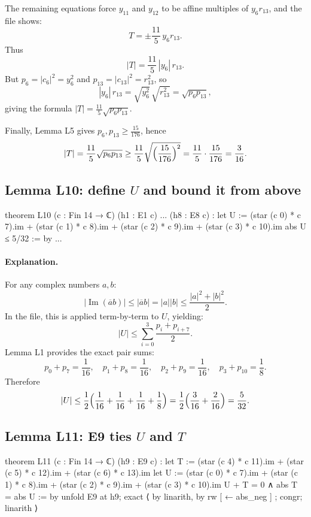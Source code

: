 \documentclass[11pt]{article}
\begin{document}
The remaining equations force $y_{11}$ and $y_{12}$ to be affine multiples of $y_6 r_{13}$, and the file shows:
\[
T = \pm \frac{11}{5}\, y_6 r_{13}.
\]
Thus
\[
|T| = \frac{11}{5}\,|y_6|\,r_{13}.
\]
But $p_6=|c_6|^2=y_6^2$ and $p_{13}=|c_{13}|^2=r_{13}^2$, so
\[
|y_6|\,r_{13} = \sqrt{y_6^2}\,\sqrt{r_{13}^2} = \sqrt{p_6p_{13}},
\]
giving the formula $|T|=\frac{11}{5}\sqrt{p_6p_{13}}$.

Finally, Lemma L5 gives $p_6,p_{13}\ge \frac{15}{176}$, hence
\[
|T|=\frac{11}{5}\sqrt{p_6p_{13}}
\ge \frac{11}{5}\sqrt{\Bigl(\frac{15}{176}\Bigr)^2}
= \frac{11}{5}\cdot\frac{15}{176}
= \frac{3}{16}.
\]

\subsection*{Lemma L10: define $U$ and bound it from above}

\begin{LeanCode}
theorem L10 (c : Fin 14 → ℂ)
  (h1 : E1 c) ... (h8 : E8 c) :
  let U := (star (c 0) * c 7).im + (star (c 1) * c 8).im
         + (star (c 2) * c 9).im + (star (c 3) * c 10).im
  abs U ≤ 5/32 := by
  ...
\end{LeanCode}

\paragraph{Explanation.}
For any complex numbers $a,b$:
\[
|\operatorname{Im}(\overline{a}b)| \le |\overline{a}b| = |a||b|
\le \frac{|a|^2+|b|^2}{2}.
\]
In the file, this is applied term-by-term to $U$, yielding:
\[
|U|
\le \sum_{i=0}^{3} \frac{p_i+p_{i+7}}{2}.
\]
Lemma L1 provides the exact pair sums:
\[
p_0+p_7=\frac{1}{16},\quad p_1+p_8=\frac{1}{16},\quad p_2+p_9=\frac{1}{16},\quad p_3+p_{10}=\frac{1}{8}.
\]
Therefore
\[
|U| \le \frac{1}{2}\Bigl(\frac{1}{16}+\frac{1}{16}+\frac{1}{16}+\frac{1}{8}\Bigr)
= \frac{1}{2}\Bigl(\frac{3}{16}+\frac{2}{16}\Bigr)
= \frac{5}{32}.
\]

\subsection*{Lemma L11: E9 ties $U$ and $T$}

\begin{LeanCode}
theorem L11 (c : Fin 14 → ℂ)
  (h9 : E9 c) :
  let T := (star (c 4) * c 11).im + (star (c 5) * c 12).im + (star (c 6) * c 13).im
  let U := (star (c 0) * c 7).im + (star (c 1) * c 8).im + (star (c 2) * c 9).im + (star (c 3) * c 10).im
  U + T = 0 ∧ abs T = abs U := by
  unfold E9 at h9;
  exact ⟨ by linarith, by rw [ ← abs_neg ] ; congr; linarith ⟩
\end{LeanCode}
\end{document}
